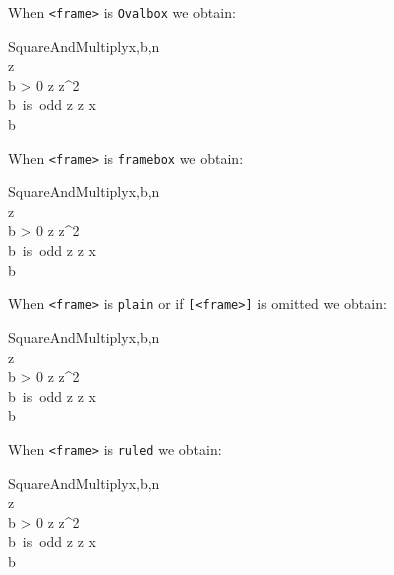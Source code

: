 \documentclass[a4]{article}
\begin{document}
\noindent When \verb+<frame>+ is \verb+Ovalbox+ we obtain:

\begin{pseudocode}[Ovalbox]{SquareAndMultiply}{x,b,n}
 \\
 z\\
 \WHILE b > 0 \DO
 \BEGIN
  z \GETS z^2  \\
  \IF b\mbox{ is odd} 
    \THEN z \GETS z \cdot x   \\
    b \GETS {}
 \END\\
\end{pseudocode}

\noindent When \verb+<frame>+ is \verb+framebox+ we obtain:

\begin{pseudocode}[framebox]{SquareAndMultiply}{x,b,n}
 \\
 z\\
 \WHILE b > 0 \DO
 \BEGIN
  z \GETS z^2  \\
  \IF b\mbox{ is odd} 
    \THEN z \GETS z \cdot x   \\
    b \GETS {}
 \END\\
\end{pseudocode}

\noindent When \verb+<frame>+ is \verb+plain+ or if \verb+[<frame>]+ is omitted we obtain:

\begin{pseudocode}[plain]{SquareAndMultiply}{x,b,n}
 \\
 z\\
 \WHILE b > 0 \DO
 \BEGIN
  z \GETS z^2  \\
  \IF b\mbox{ is odd} 
    \THEN z \GETS z \cdot x   \\
    b \GETS {}
 \END\\
\end{pseudocode}

\noindent When \verb+<frame>+ is \verb+ruled+ we obtain:

\begin{pseudocode}[ruled]{SquareAndMultiply}{x,b,n}
 \\
 z\\
 \WHILE b > 0 \DO
 \BEGIN
  z \GETS z^2  \\
  \IF b\mbox{ is odd} 
    \THEN z \GETS z \cdot x   \\
    b \GETS {}
 \END\\
\end{pseudocode}
\end{document}
